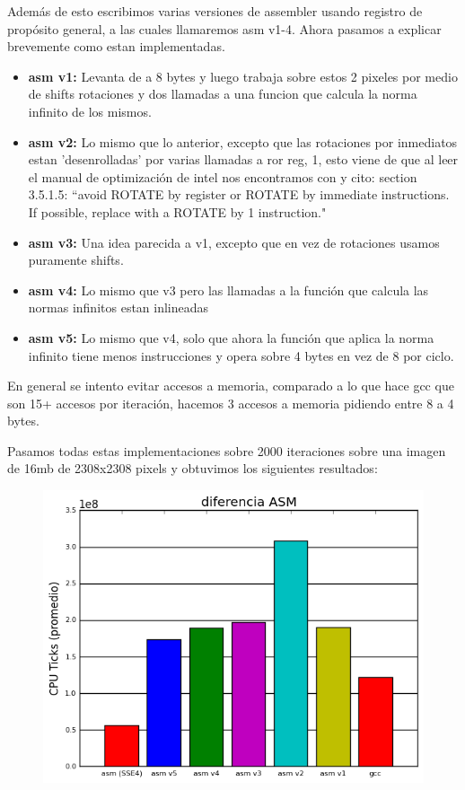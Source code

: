\documentclass[a4paper]{article}
\begin{document}

Además de esto escribimos varias versiones de assembler usando registro de propósito general, a las cuales llamaremos asm v1-4. Ahora pasamos a explicar brevemente como estan implementadas.

\begin{itemize}[label={}]
\item[] \textbf{asm v1:} Levanta de a 8 bytes y luego trabaja sobre estos 2 pixeles por medio de shifts rotaciones y dos llamadas a una funcion que calcula la norma infinito de los mismos.
\item[] \textbf{asm v2:} Lo mismo que lo anterior, excepto que las rotaciones por inmediatos estan 'desenrolladas' por varias llamadas a ror reg, 1, esto viene de que al leer el manual de optimización de intel nos encontramos con y cito: section 3.5.1.5: ``avoid ROTATE by register or ROTATE by immediate instructions. If possible, replace with a ROTATE by 1 instruction."
\item[] \textbf{asm v3:} Una idea parecida a v1, excepto que en vez de rotaciones usamos puramente shifts.
\item[] \textbf{asm v4:} Lo mismo que v3 pero las llamadas a la función que calcula las normas infinitos estan inlineadas
\item[] \textbf{asm v5:} Lo mismo que v4, solo que ahora la función que aplica la norma infinito tiene menos instrucciones y opera sobre 4 bytes en vez de 8 por ciclo.
\end{itemize}

En general se intento evitar accesos a memoria, comparado a lo que hace gcc que son 15+ accesos por iteración, hacemos 3 accesos a memoria pidiendo entre 8 a 4 bytes.

Pasamos todas estas implementaciones sobre 2000 iteraciones sobre una imagen de 16mb de 2308x2308 pixels y obtuvimos los siguientes resultados:

\begin{figure}[h]
	\centerline{\includegraphics[scale=1]{imagenes/test_diferencia_ASM_imp}}
\end{figure}
\end{document}
